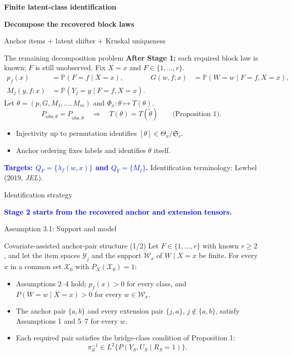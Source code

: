 \documentclass[aspectratio=169,10pt]{beamer}
\newcommand{\slideannotation}{\fontsize{8pt}{9.6pt}\selectfont}
\newcommand{\Prb}{\mathbb P}
\newcommand{\bluekey}[1]{\textcolor{Blue}{\textbf{#1}}}
\begin{document}
\begin{frame}[plain]
\vfill\centering
{\color{Blue}\large\bfseries Finite latent-class identification}\par\vspace{.6em}
{\fontsize{20}{24}\selectfont\bfseries Decompose the recovered block laws}\par\vspace{1em}
{\large Anchor items $+$ latent shifter $+$ Kruskal uniqueness}
\vfill
\end{frame}

\begin{frame}{The remaining decomposition problem}
\textbf{After Stage 1:} each required block law is known; $F$ is still unobserved.
Fix $X=x$ and $F\in\{1,\ldots,r\}$.
\[
\begin{aligned}
p_f(x)&=\Prb(F=f\mid X=x),&
G(w,f;x)&=\Prb(W=w\mid F=f,X=x),\\
M_j(y,f;x)&=\Prb(Y_j=y\mid F=f,X=x).
\end{aligned}
\]
Let $\theta=(p,G,M_1,\ldots,M_m)$ and $\Phi_x:\theta\mapsto T(\theta)$.
\[
P_{\mathrm{obs},\theta}=P_{\mathrm{obs},\widetilde\theta}
\quad\Longrightarrow\quad T(\theta)=T(\widetilde\theta)
\qquad\text{(Proposition 1).}
\]
\begin{itemize}
\item Injectivity up to permutation identifies $[\theta]\in\Theta_x/\mathfrak S_r$.
\item Anchor ordering fixes labels and identifies $\theta$ itself.
\end{itemize}
\bluekey{Targets: $Q_F=\{\lambda_f(w,x)\}$ and $Q_Y=\{M_j\}$.}
{\slideannotation Identification terminology: Lewbel (2019, \emph{JEL}).}
\end{frame}

\begin{frame}{Identification strategy}
\centering

\medskip
\bluekey{Stage 2 starts from the recovered anchor and extension tensors.}
\end{frame}

\begin{frame}{Assumption 3.1: Support and model}
\begin{block}{Covariate-assisted anchor-pair structure (1/2)}
Let $F\in\{1,\ldots,r\}$ with known $r\ge2$, and let the item spaces
$\mathcal Y_j$ and the support $\mathcal W_x$ of $W\mid X=x$ be finite.
For every $x$ in a common set $\mathcal X_0$ with $P_X(\mathcal X_0)=1$:
\begin{itemize}
  \item Assumptions 2--4 hold; $p_f(x)>0$ for every class, and $P(W=w\mid X=x)>0$ for every $w\in\mathcal W_x$.
  \item The anchor pair $\{a,b\}$ and every extension pair $\{j,a\}$, $j\notin\{a,b\}$, satisfy Assumptions 1 and 5--7 for every $w$.
  \item Each required pair satisfies the bridge-class condition of Proposition 1:
  \[
  \pi_S^{-1}\in L^2\{P(Y_S,U_S\mid R_S=1)\}.
  \]
\end{itemize}
\end{block}
\end{frame}
\end{document}
